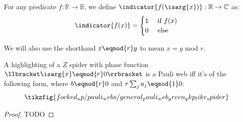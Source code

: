 \begin{definition}\label{defn:indicator_function}
For any predicate $f: \mathbb{R} \to \mathbb{B}$, we define $\indicator{f(\isarg{x})} : \mathbb{R} \to \mathbb{C}$ as:
\begin{equation}\label{eq:indicator_function}
\indicator{f(x)} = \begin{cases}
                       1 &\text{ if } f(x) \\
                       0 &\text{ else }
\end{cases}
\end{equation}
\end{definition}

We will also use the shorthand $x \eqmod{r} y$ to mean $x = y$ mod $r$.

\begin{proposition}\label{thm:general_pauli_web_green_gkp_like_spider}
A highlighting of a $Z$ spider with phase function $\llbracket \isarg{x} \eqmod{r} 0 \rrbracket$ is a Pauli web iff it's of the following form, where $b \eqmod{r} 0$ and $r \sum_j a_j \eqmod{1} 0$:
\begin{equation}\label{eq:general_pauli_web_green_gkp_like_spider}
\tikzfig{focked_up/pauli_webs/general_pauli_web_green_gkp_like_spider}
\end{equation}
\begin{proof}
    TODO
\end{proof}
\end{proposition}
